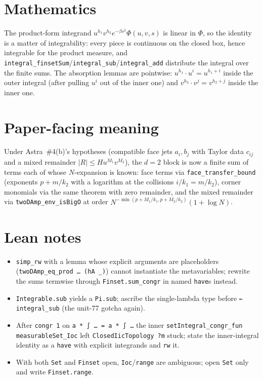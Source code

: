 \documentclass[11pt]{article}
\begin{document}
\section{Mathematics}

The product-form integrand $u^{h_1}v^{h_2}e^{-\beta s^2}\Phi(u,v,s)$ is linear in $\Phi$, so the
identity is a matter of integrability: every piece is continuous on the closed box, hence integrable
for the product measure, and \texttt{integral\_finsetSum}/\texttt{integral\_sub}/\texttt{integral\_add}
distribute the integral over the finite sums. The absorption lemmas are pointwise: $u^{h_1}\cdot u^i
=u^{h_1+i}$ inside the outer integral (after pulling $u^i$ out of the inner one) and
$v^{h_2}\cdot v^j=v^{h_2+j}$ inside the inner one.

\section{Paper-facing meaning}

Under Astra~\#4(b)'s hypotheses (compatible face jets $a_i,b_j$ with Taylor data $c_{ij}$ and a mixed
remainder $|R|\le Hu^{M_1}v^{M_2}$), the $d=2$ block is now a finite sum of terms each of whose
$N$-expansion is known: face terms via \texttt{face\_transfer\_bound} (exponents $p+m/k_2$ with a
logarithm at the collisions $i/k_1=m/k_2$), corner monomials via the same theorem with zero
remainder, and the mixed remainder via \texttt{twoDAmp\_env\_isBigO} at order
$N^{-\min(p+M_1/k_1,p+M_2/k_2)}(1+\log N)$.

\section{Lean notes}

\begin{itemize}
\item \texttt{simp\_rw} with a lemma whose explicit arguments are placeholders
(\texttt{twoDAmp\_eq\_prod … (hA \_)}) cannot instantiate the metavariables; rewrite the sums
termwise through \texttt{Finset.sum\_congr} in named \texttt{have}s instead.
\item \texttt{Integrable.sub} yields a \texttt{Pi.sub}; ascribe the single-lambda type before
\texttt{← integral\_sub} (the unit-77 gotcha again).
\item After \texttt{congr 1} on \texttt{a * ∫ … = a * ∫ …} the inner
\texttt{setIntegral\_congr\_fun measurableSet\_Ioc} left \texttt{ClosedIicTopology ?m} stuck;
state the inner-integral identity as a \texttt{have} with explicit integrands and \texttt{rw} it.
\item With both \texttt{Set} and \texttt{Finset} open, \texttt{Ioc}/\texttt{range} are ambiguous;
open \texttt{Set} only and write \texttt{Finset.range}.
\end{itemize}
\end{document}
